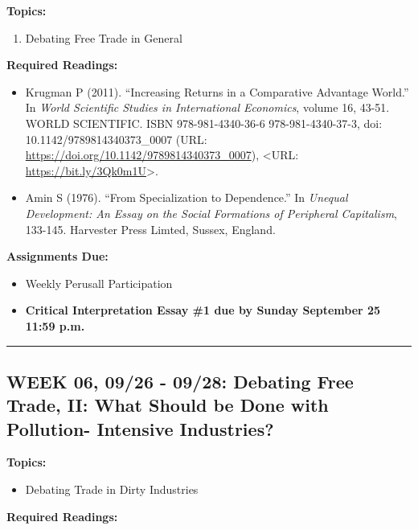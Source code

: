 \documentclass[11pt,]{article}
\providecommand{\tightlist}{%
  \setlength{\itemsep}{0pt}\setlength{\parskip}{0pt}}
\begin{document}
\textbf{Topics:}

\begin{enumerate}
\def\labelenumi{(\arabic{enumi})}
\tightlist
\item
  Debating Free Trade in General
\end{enumerate}

\textbf{Required Readings:}

\begin{itemize}
\item
  Krugman P (2011). ``Increasing Returns in a Comparative Advantage
  World.'' In \emph{World Scientific Studies in International
  Economics}, volume 16, 43-51. WORLD SCIENTIFIC. ISBN 978-981-4340-36-6
  978-981-4340-37-3, doi: 10.1142/9789814340373\_0007 (URL:
  \url{https://doi.org/10.1142/9789814340373_0007}), \textless URL:
  \url{https://bit.ly/3Qk0m1U}\textgreater.
\item
  Amin S (1976). ``From Specialization to Dependence.'' In \emph{Unequal
  Development: An Essay on the Social Formations of Peripheral
  Capitalism}, 133-145. Harvester Press Limted, Sussex, England.
\end{itemize}

\textbf{Assignments Due:}

\begin{itemize}
\tightlist
\item
  Weekly Perusall Participation
\item
  \textbf{Critical Interpretation Essay \#1 due by Sunday September 25
  11:59 p.m.}
\end{itemize}

\bigbreak
\hrule

\hypertarget{week-06-0926---0928-debating-free-trade-ii-what-should-be-done-with-pollution--intensive-industries}{%
\subsection{WEEK 06, 09/26 - 09/28: Debating Free Trade, II: What Should
be Done with Pollution- Intensive
Industries?}\label{week-06-0926---0928-debating-free-trade-ii-what-should-be-done-with-pollution--intensive-industries}}

\textbf{Topics:}

\begin{itemize}
\tightlist
\item
  Debating Trade in Dirty Industries
\end{itemize}

\textbf{Required Readings:}
\end{document}
